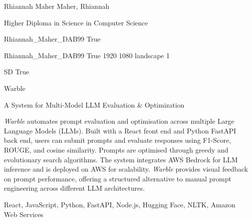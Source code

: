 
\begingroup{}\relax



\def\Key{Rhiannah_Maher_DAB99}

{Rhiannah Maher}
{Maher, Rhiannah}

{Higher Diploma in Science in Computer Science}

{Rhiannah_Maher_DAB99}
{True}

{Rhiannah_Maher_DAB99}
{True}
{1920}
{1080}
{landscape}
{1}

{SD}
{True}

{Warble}

{A System for Multi-Model LLM Evaluation \& Optimization}

{\emph{Warble} automates prompt evaluation and optimisation across multiple Large Language Models (LLMs). Built with a React front end and Python FastAPI back end, users can submit prompts and evaluate responses using F1-Score, ROUGE, and cosine similarity. 
Prompts are optimised through greedy and evolutionary search algorithms. The system integrates AWS Bedrock for LLM inference and is deployed on AWS for scalability. \emph{Warble} provides visual feedback on prompt performance, offering a structured alternative to manual prompt engineering across different LLM architectures.}

{React, JavaScript, Python, FastAPI, Node.js, Hugging Face, NLTK, Amazon Web Services}

